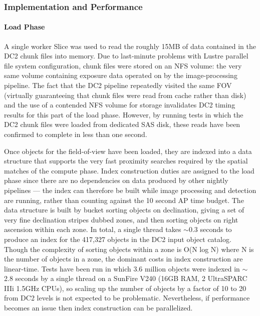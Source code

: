 \subsubsection{Implementation and Performance}

\paragraph{Load Phase}

A single worker Slice was used to read the roughly 15MB of data contained in
the DC2 chunk files into memory. Due to last-minute problems with Lustre
parallel file system configuration, chunk files were stored on an NFS volume:
the very same volume containing exposure data operated on by the
image-processing pipeline. The fact that the DC2 pipeline repeatedly visited
the same FOV (virtually guaranteeing that chunk files were read from cache
rather than disk) and the use of a contended NFS volume for storage
invalidates DC2 timing results for this part of the load phase. However, by
running tests in which the DC2 chunk files were loaded from dedicated SAS
disk, these reads have been confirmed to complete in less than one second.

Once objects for the field-of-view have been loaded, they are indexed into a
data structure that supports the very fast proximity searches required by the
spatial matches of the compute phase. Index construction duties are assigned
to the load phase since there are no dependencies on data produced by other
nightly pipelines --- the index can therefore be built while image processing
and detection are running, rather than counting against the 10 second AP time
budget. The data structure is built by bucket sorting objects on declination,
giving a set of very fine declination stripes dubbed zones, and then sorting
objects on right ascension within each zone. In total, a single thread takes
\ensuremath{\sim}0.3 seconds to produce an index for the 417,327 objects in
the DC2 input object catalog. Though the complexity of sorting objects within
a zone is O(N log N) where N is the number of objects in a zone, the dominant
costs in index construction are linear-time. Tests have been run in which 3.6
million objects were indexed in \ensuremath{\sim}2.8 seconds by a single
thread on a SunFire V240 (16GB RAM, 2 UltraSPARC IIIi 1.5GHz CPUs), so scaling
up the number of objects by a factor of 10 to 20 from DC2 levels is not
expected to be problematic. Nevertheless, if performance becomes an issue then
index construction can be parallelized.

